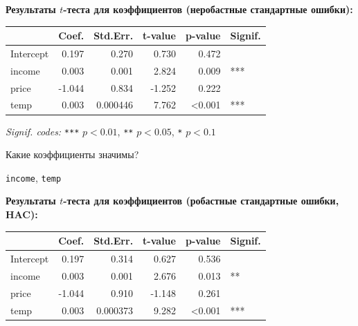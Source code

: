\documentclass[
  russian,
]{article}
\newcounter{none} %
\begin{document}
\textbf{Результаты \(t\)-теста для коэффициентов (неробастные
стандартные ошибки):}

{\def\LTcaptype{none} %
\begin{longtable}[]{@{}lrrrrl@{}}
\toprule\noalign{}
& Coef. & Std.Err. & t-value & p-value & Signif. \\
\midrule\noalign{}
\endhead
\bottomrule\noalign{}
\endlastfoot
Intercept & 0.197 & 0.270 & 0.730 & 0.472 & \\
income & 0.003 & 0.001 & 2.824 & 0.009 & *** \\
price & -1.044 & 0.834 & -1.252 & 0.222 & \\
temp & 0.003 & 0.000446 & 7.762 & \textless0.001 & *** \\
\end{longtable}
}

\emph{Signif. codes:} \texttt{***} \(p<0.01\), \texttt{**} \(p<0.05\),
\texttt{*} \(p<0.1\)

Какие коэффициенты значимы?

\begin{tcolorbox}[enhanced jigsaw, arc=.35mm, bottomrule=.15mm, bottomtitle=1mm, breakable, colback=white, colbacktitle=quarto-callout-note-color!10!white, colframe=quarto-callout-note-color-frame, coltitle=black, left=2mm, leftrule=.75mm, opacityback=0, opacitybacktitle=0.6, rightrule=.15mm, title=\textcolor{quarto-callout-note-color}{\faInfo}\hspace{0.5em}{Коэффициенты, значимые на уровне 1\% (по неробастным стандартным
ошибкам)}, titlerule=0mm, toprule=.15mm, toptitle=1mm]

\texttt{income}, \texttt{temp}

\end{tcolorbox}

\textbf{Результаты \(t\)-теста для коэффициентов (робастные стандартные
ошибки, HAC):}

{\def\LTcaptype{none} %
\begin{longtable}[]{@{}lrrrrl@{}}
\toprule\noalign{}
& Coef. & Std.Err. & t-value & p-value & Signif. \\
\midrule\noalign{}
\endhead
\bottomrule\noalign{}
\endlastfoot
Intercept & 0.197 & 0.314 & 0.627 & 0.536 & \\
income & 0.003 & 0.001 & 2.676 & 0.013 & ** \\
price & -1.044 & 0.910 & -1.148 & 0.261 & \\
temp & 0.003 & 0.000373 & 9.282 & \textless0.001 & *** \\
\end{longtable}
}
\end{document}
